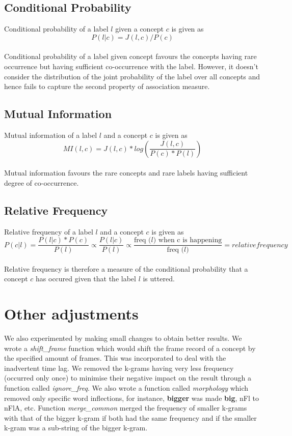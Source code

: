 \documentclass[12pt, a4paper]{report}
\begin{document}
\subsection{Conditional Probability}
Conditional probability of a label $l$ given a concept $c$ is given as\\
$$
P (l|c) = J(l, c)/P (c)
$$
\\
Conditional probability of a label given concept favours the concepts having rare occurrence but having sufficient co-occurrence with the label. However, it doesn’t consider the distribution of the joint probability of the label over all concepts and hence fails to capture the second property of association measure.

\subsection{Mutual Information}
Mutual information of a label $l$ and a concept $c$ is given as\\
$$
MI(l, c) = J(l, c) \ast log(\frac{J(l, c)}{P (c) \ast P (l)})
$$
\\
Mutual information favours the rare concepts and rare labels having sufficient degree of co-occurrence.

\subsection{Relative Frequency}
Relative frequency of a label $l$ and a concept $c$ is given as\\
$$
P(c|l) = \frac{P(l|c) \ast P(c)}{P(l)} \propto \frac{P(l|c)}{P(l)} \propto \frac{\text{freq ($l$) when c is happening}}{\text{freq ($l$)}} = relative frequency
$$
\\
Relative frequency is therefore a measure of the conditional probability that a concept $c$ has occured given that the label $l$ is uttered.

\section{Other adjustments}

We also experimented by making small changes to obtain better results. We wrote a \textit{shift\_frame} function which would shift the frame record of a concept by the specified amount of frames. This was incorporated to deal with the inadvertent time lag. We removed the k-grams having very less frequency (occurred only once) to minimise their negative impact on the result through a function called \textit{ignore\_freq}. We also wrote a function called \textit{morphology} which removed only specific word inflections, for instance, \textbf{bigger} was made \textbf{big}, {\dn nFl\?} to {\dn nFlA}, etc. Function \textit{merge\_common} merged the frequency of smaller k-grams with that of the bigger k-gram if both had the same frequency and if the smaller k-gram was a sub-string of the bigger k-gram.
\end{document}
